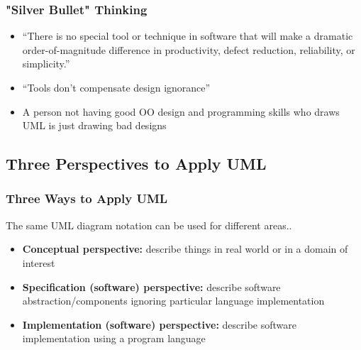 \documentclass{beamer}
\begin{document}
\begin{frame}
	\frametitle{"Silver Bullet" Thinking}
	\begin{itemize}
    \item<+-> ``There is no special tool or technique in software that will make a dramatic order-of-magnitude difference in productivity, defect reduction, reliability, or simplicity.''
    \item<+->  ``Tools don't compensate design ignorance''
    \item<+-> A person not having good OO design and programming skills who draws UML is just drawing bad designs
    \end{itemize}
\end{frame}

\subsection{Three Perspectives to Apply UML}
\begin{frame}
	\frametitle{Three Ways to Apply UML}
	The same UML diagram notation can be used for different areas..
	\begin{itemize}
		\item<+-> \textbf{Conceptual perspective:} describe things in real world or in a domain of interest 
		\item<+-> \textbf{Specification (software) perspective:} describe software abstraction/components ignoring particular language implementation
		\item<+-> \textbf{Implementation (software) perspective:} describe software implementation using a program language
    \end{itemize}
\end{frame}
\end{document}
